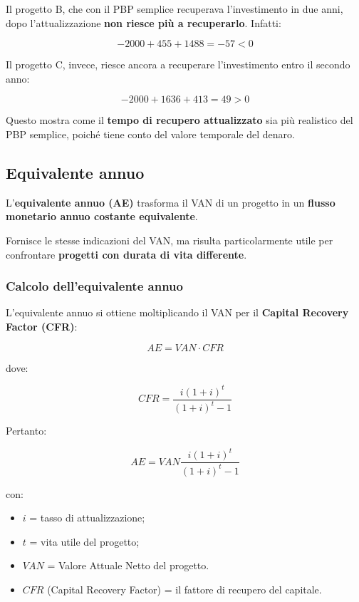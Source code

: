 \noindent Il progetto B, che con il PBP semplice recuperava l'investimento in due anni, 
dopo l'attualizzazione \textbf{non riesce più a recuperarlo}. Infatti:

\[
-2000 + 455 + 1488 = -57 < 0
\]

\noindent Il progetto C, invece, riesce ancora a recuperare l'investimento entro il secondo anno:

\[
-2000 + 1636 + 413 = 49 > 0
\]

\noindent Questo mostra come il \textbf{tempo di recupero attualizzato} sia più realistico 
del PBP semplice, poiché tiene conto del valore temporale del denaro.

\subsection{Equivalente annuo}

\noindent L'\textbf{equivalente annuo (AE)} trasforma il VAN di un progetto in un
\textbf{flusso monetario annuo costante equivalente}.

\medskip

\noindent Fornisce le stesse indicazioni del VAN, ma risulta particolarmente utile
per confrontare \textbf{progetti con durata di vita differente}.

\subsubsection*{Calcolo dell'equivalente annuo}

\noindent L'equivalente annuo si ottiene moltiplicando il VAN per il
\textbf{Capital Recovery Factor (CFR)}:

\[
\boxed{
AE = VAN \cdot CFR
}
\]

\noindent dove:

\[
CFR =
\frac{i(1+i)^t}{(1+i)^t-1}
\]

\noindent Pertanto:

\[
\boxed{
AE =
VAN
\frac{i(1+i)^t}{(1+i)^t-1}
}
\]

\noindent con:

\begin{itemize}
    \item $i$ = tasso di attualizzazione;
    \item $t$ = vita utile del progetto;
    \item $VAN$ = Valore Attuale Netto del progetto.
    \item $CFR$ (Capital Recovery Factor) = il fattore di recupero del capitale.
\end{itemize}

